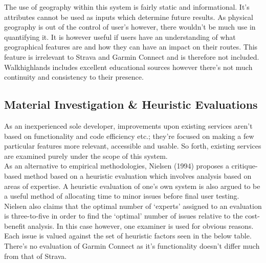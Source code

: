 \documentclass[11pt, english]{article}
\begin{document}
		The use of geography within this system is fairly static and informational. It's attributes cannot be used as inputs which determine future results. As physical geography is out of the control of user's however, there wouldn't be much use in quantifying it. It is however useful if users have an understanding of what geographical features are and how they can have an impact on their routes. This feature is irrelevant to Strava and Garmin Connect and is therefore not included. Walkhighlands includes excellent educational sources however there's not much continuity and consistency to their presence.

	\subsection{Material Investigation \& Heuristic Evaluations}

	As an inexperienced sole developer, improvements upon existing services aren't based on functionality and code efficiency etc.; they're focused on making a few particular features more relevant, accessible and usable. So forth, existing services are examined purely under the scope of this system.\\

	As an alternative to empirical methodologies, Nielsen (1994) proposes a critique-based method based on a heuristic evaluation which involves analysis based on areas of expertise. A heuristic evaluation of one's own system is also argued to be a useful method of allocating time to minor issues before final user testing. Nielsen also claims that the optimal number of `experts' assigned to an evaluation is three-to-five in order to find the `optimal' number of issues relative to the cost-benefit analysis. In this case however, one examiner is used for obvious reasons. Each issue is valued against the set of heuristic factors seen in the below table. There's no evaluation of Garmin Connect as it's functionality doesn't differ much from that of Strava.

\newpage
\end{document}
